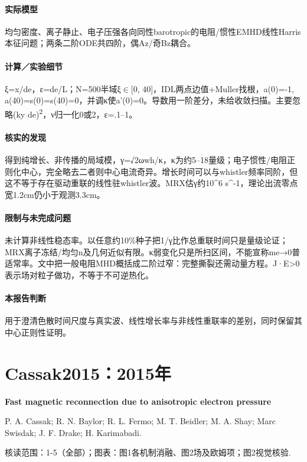 \documentclass[UTF8,a4paper,11pt,openany,fontset=fandol]{ctexbook}
\begin{document}
\paragraph{实际模型}均匀密度、离子静止、电子压强各向同性barotropic的电阻/惯性EMHD线性Harris本征问题；两条二阶ODE共四阶，偶Az/奇Bz耦合。

\paragraph{计算／实验细节}ξ=x/de，ε=de/L；N=500半域ξ\ensuremath{\in}[0, 40]，IDL两点边值+Muller找根，a(0)=-1, a(40)=s(0)=s(40)=0，并调κ使a'(0)=0。导数用一阶差分，未给收敛扫描。主要忽略(ky de)\textsuperscript{2}，ν归一化0或2，ε=.1–1。

\paragraph{核实的发现}得到纯增长、非传播的局域模，γ=√2ωwh/κ，κ为约5–18量级；电子惯性/电阻正则化中心，完全略去二者则中心电流奇异。增长时间可以与whistler频率同阶，但这不等于存在驱动重联的线性驻whistler波。MRX估γ约10\textasciicircum{}6 s\textasciicircum{}-1，理论出流零点宽1.2cm仍小于观测3.3cm。

\paragraph{限制与未完成问题}未计算非线性稳态率。以任意约10\%种子把1/γ比作总重联时间只是量级论证；MRX离子冻结/均匀n及几何近似有限。κ弱变化只是所扫区间，不能宣称me→0普适常率。文中把一般电阻MHD概括成二阶过窄：完整撕裂还需动量方程。J·E>0表示场对粒子做功，不等于不可逆热化。

\paragraph{本报告判断}用于澄清色散时间尺度与真实波、线性增长率与非线性重联率的差别，同时保留其中心正则性证明。

\section{Cassak2015：2015年}\label{paper:Cassak2015}

\textbf{Fast magnetic reconnection due to anisotropic electron pressure}\citep{Cassak2015}\

P. A. Cassak;  R. N. Baylor;  R. L. Fermo;  M. T. Beidler;  M. A. Shay;  Marc Swisdak;  J. F. Drake;  H. Karimabadi.

\textsf{核读范围：}1-5（全部）；\textsf{图表：}图1各机制消融、图2场及欧姆项；图2视觉核验.
\end{document}
